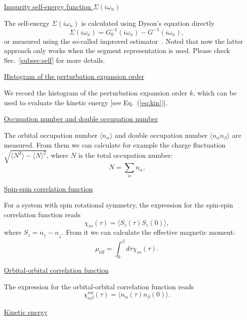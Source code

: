 \underline{Impurity self-energy function $\Sigma(i\omega_n)$}

The self-energy $\Sigma(i\omega_n)$ is calculated using Dyson's equation directly
\begin{equation}
\Sigma(i\omega_n) = G^{-1}_{0}(i\omega_n) - G^{-1}(i\omega_n),
\end{equation}
 or measured using the so-called improved estimator~\cite{PhysRevB.89.235128,PhysRevB.85.205106}. Noted that now the latter approach only works when the segment representation is used. Please check Sec.~\ref{subsec:self} for more details.

\underline{Histogram of the perturbation expansion order}

We record the histogram of the perturbation expansion order $k$, which can be used to evaluate the kinetic energy [see Eq.~(\ref{eq:kin})].

\underline{Occupation number and double occupation number}

The orbital occupation number $\langle n_\alpha\rangle$ and double occupation number $\langle n_\alpha n_\beta \rangle$ are measured. From them we can calculate for example the charge fluctuation $\sqrt{\langle N^2 \rangle - \langle N \rangle^2}$, where $N$ is the total occupation number:
\begin{equation}
N = \sum_{\alpha} n_{\alpha}.
\end{equation}

\underline{Spin-spin correlation function}

For a system with spin rotational symmetry, the expression for the spin-spin correlation function reads 
\begin{equation}
\chi_{ss}(\tau) = \langle S_{z}(\tau) S_{z}(0) \rangle,
\end{equation}
where $S_{z} = n_{\uparrow} - n_{\downarrow}$. From it we can calculate the effective magnetic moment:
\begin{equation}
\mu_{\text{eff}} = \int^{\beta}_{0}d\tau \chi_{ss}(\tau).
\end{equation}

\underline{Orbital-orbital correlation function}

The expression for the orbital-orbital correlation function reads 
\begin{equation}
\chi^{nn}_{\alpha\beta}(\tau) = \langle n_{\alpha}(\tau) n_{\beta}(0) \rangle.
\end{equation}

\underline{Kinetic energy}

